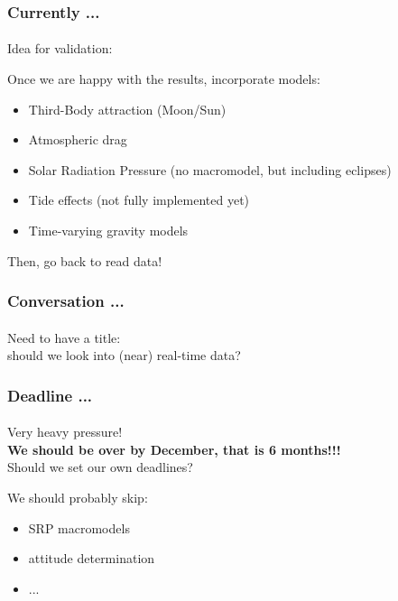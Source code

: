 \documentclass{beamer}
\newcommand{\bitem}{\item[\textbullet]}
\begin{document}
\begin{frame}\frametitle{Currently ...}\framesubtitle{}
    Idea for validation:
    \medskip

    Once we are happy with the results, incorporate models:
    \begin{itemize}
        \bitem Third-Body attraction (Moon/Sun)
        \bitem Atmospheric drag
        \bitem Solar Radiation Pressure (no macromodel, but including eclipses)
        \bitem Tide effects (not fully implemented yet)
        \bitem Time-varying gravity models
    \end{itemize}

    \medskip
    Then, go back to read data!

\end{frame}

\begin{frame}\frametitle{Conversation ...}\framesubtitle{}
    Need to have a title:\\
    \medskip
    should we look into (near) real-time data?
\end{frame}

\begin{frame}\frametitle{Deadline ...}\framesubtitle{}
    Very heavy pressure!\\
    \textbf{We should be over by December, that is 6 months!!!}\\
    Should we set our own deadlines?
    
    \medskip
    We should probably skip:
    \begin{itemize}
        \bitem SRP macromodels
        \bitem attitude determination
        \bitem ...
    \end{itemize}
\end{frame}


\end{document}

